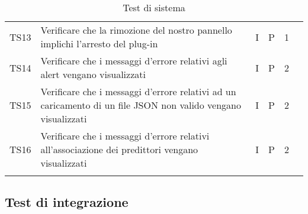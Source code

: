 \begin{longtable} {
	>{}p{12mm}
	>{}p{79.5mm}
	>{}p{9mm}
	>{}p{8mm}
	>{}p{14mm}
	>{}p{0mm}}
	TS13 & Verificare che la rimozione del nostro pannello implichi l'arresto del plug-in & I & P & 1 & \TBstrut \\ [2mm]
	TS14 & Verificare che i messaggi d'errore relativi agli alert vengano visualizzati & I & P & 2 & \TBstrut \\ [2mm]
	TS15 & Verificare che i messaggi d'errore relativi ad un caricamento di un file JSON non valido vengano visualizzati & I & P & 2 & \TBstrut \\ [2mm]
	TS16 & Verificare che i messaggi d'errore relativi all'associazione dei predittori vengano visualizzati & I & P & 2 & \TBstrut \\ [2mm]
	\rowcolor{white}
	\caption{Test di sistema}
\end{longtable}


\subsection{Test di integrazione}


